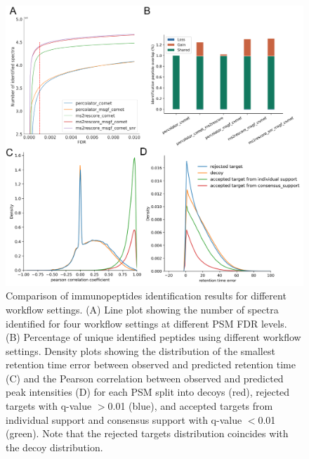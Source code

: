 \documentclass[12pt]{article}
\begin{document}
\begin{figure}[ht!]
	\centering
	\includegraphics[width=1\textwidth]{figures//PXD019643.png}
	\caption{Comparison of immunopeptides identification results for different workflow settings. (A) Line plot showing the number of spectra identified for four workflow settings at different PSM FDR levels. (B) Percentage of unique identified peptides using different workflow settings. Density plots showing the distribution of the smallest retention time error between observed and predicted retention time (C) and the Pearson correlation between observed and predicted peak intensities (D) for each PSM split into decoys (red), rejected targets with q-value $>$0.01 (blue), and accepted targets from individual support and consensus support with q-value $<$0.01 (green). Note that the rejected targets distribution coincides with the decoy distribution.}
	\label{fig:PXD019643_immunopeptides}
\end{figure}
\end{document}
